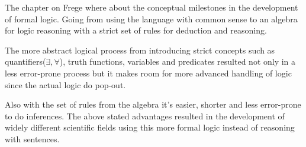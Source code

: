 \documentclass{article}
\begin{document}

    The chapter on Frege where about the conceptual milestones in the development of
    formal logic. Going from using the language with common sense to an algebra for 
    logic reasoning with a strict set of rules for deduction and reasoning. 
    
    The more abstract logical process from introducing strict concepts
    such as quantifiers($\exists,\forall$), truth functions, variables and
    predicates resulted not only in a less error-prone process but it makes 
    room for more advanced handling of logic since the actual logic do pop-out.
    
    Also with the set of rules from the algebra it's easier, shorter and less
    error-prone to do inferences.
    The above stated advantages resulted in the development of widely different
    scientific fields using this more formal logic instead of reasoning with
    sentences.
\end{document}
